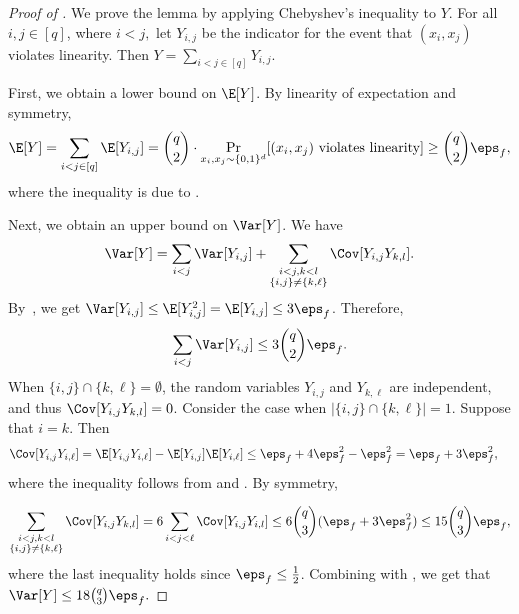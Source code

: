 \documentclass[11pt]{article}
\numberwithin{equation}{section}
\theoremstyle{definition}
\theoremstyle{plain}
\begin{document}
\begin{proof}[Proof of ]
We prove the lemma by applying Chebyshev's inequality to $Y$.
For all $i, j\in[q]$, where $i < j,$ let $Y_{i,j}$ be the indicator 
for the event that $(x_i, x_j)$ violates linearity.
Then $Y = \sum_{i < j \in [q]} Y_{i,j}$. 

First, we obtain a lower bound on $\E[Y]$.  By linearity of expectation and symmetry,
\begin{equation*}
    \E[Y]= \sum_{i < j \in [q]} \E[Y_{i,j}] 
    = \binom{q}{2}\cdot \Pr_{x_i, x_j \sim \{0,1\}^d}[(x_i, x_j) \textnormal{ violates linearity}] \geq \binom{q}{2}\eps_f,
\end{equation*}
where the inequality is due to \cite[Theorem 1.2]{BellareCHKS96}.


Next, we obtain an upper bound on $\Var[Y]$. We have
%
\[
%
  \Var[Y] = \sum_{i < j} \Var[Y_{i,j}] + \sum_{\substack{i<j,k<l \\ \{i,j\} \neq \{k,\ell\}   }} \Cov[Y_{i,j}Y_{k,l}].
\]
By~, we get $\Var[Y_{i,j}] 
\leq \E[Y^2_{i,j}]=\E[Y_{i,j}] \leq 3\eps_f$. Therefore,
\begin{equation}\label{eq:variance}
    \sum_{i < j} \Var[Y_{i,j}] \leq 3\binom{q}{2}\eps_f.
\end{equation}
%
When $\{i,j\} \cap \{k,\ell\} = \emptyset$, the random variables $Y_{i,j}$ and $Y_{k,\ell}$ are independent, and thus $\Cov[Y_{i,j}Y_{k,l}] = 0$. Consider the case when $|\{i,j\} \cap \{k,\ell\}| = 1$. Suppose that $i = k$. Then
\begin{align*}
    \Cov[Y_{i,j}Y_{i,\ell}] &= \E[Y_{i,j}Y_{i,\ell}]-\E[Y_{i,j}]\E[Y_{i,\ell}]
    \leq \eps_f + 4\eps_f^2 - \eps_f^2 = \eps_f + 3\eps_f^2,
\end{align*}
where the inequality follows from  and \cite[Theorem 1.2]{BellareCHKS96}. By symmetry,


\begin{equation}\label{eq:covariance}
  \sum_{\substack{i<j,k<l \\ \{i,j\} \neq \{k,\ell\}   }} \Cov[Y_{i,j}Y_{k,l}] = 6 \sum_{\substack{i < j < \ell}} \Cov[Y_{i,j}Y_{i,l}] \leq 6\binom{q}{3}(\eps_f + 3\eps_f^2) \leq 15\binom{q}{3} \eps_f,
\end{equation}
where the last inequality holds since $\eps_f \leq \frac{1}{2}$. 
Combining  with , we get that
$\Var[Y] \leq 18\binom{q}{3}\eps_f.$


\end{proof}
\end{document}
